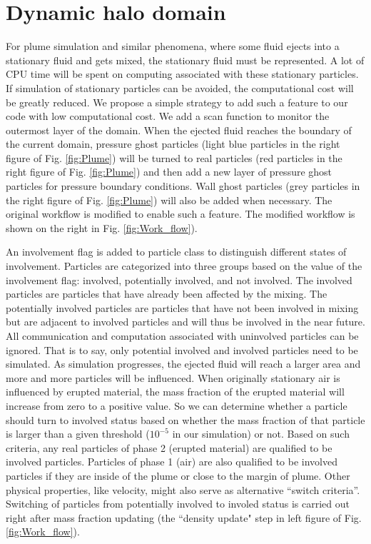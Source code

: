 \section{Dynamic halo domain} 
For plume simulation and similar phenomena, where some fluid ejects into a stationary fluid and gets mixed, the stationary fluid must be represented.
A lot of CPU time will be spent on computing associated with these stationary particles. If simulation of stationary particles can be avoided, the computational cost will be greatly reduced.
We propose a simple strategy to add such a feature to our code with low computational cost. We add a scan function to monitor the outermost layer of the domain. When the ejected fluid reaches the boundary of the current domain, pressure ghost particles (light blue particles in the right figure of Fig. \ref{fig:Plume}) will be turned to real particles (red particles in the right figure of Fig. \ref{fig:Plume}) and then add a new layer of pressure ghost particles for pressure boundary conditions. Wall ghost particles (grey particles in the right figure of Fig. \ref{fig:Plume}) will also be added when necessary. The original workflow is modified to enable such a feature. The modified workflow is shown on the right in Fig. \ref{fig:Work_flow}).

An involvement flag is added to particle class to distinguish different states of involvement. Particles are categorized into three groups based on the value of the involvement flag: involved, potentially involved, and not involved. The involved particles are particles that have already been affected by the mixing. The potentially involved particles are particles that have not been involved in mixing but are adjacent to involved particles and will thus be involved in the near future. 
All communication and computation associated with uninvolved particles can be ignored. That is to say, only potential involved and involved particles need to be simulated.
As simulation progresses, the ejected fluid will reach a larger area and more and more particles will be influenced. When originally stationary air is influenced by erupted material, the mass fraction of the erupted material will increase from zero to a positive value. So we can determine whether a particle should turn to involved status based on whether the mass fraction of that particle is larger than a given threshold ($10^{-5} $ in our simulation) or not. Based on such criteria, any real particles of phase 2 (erupted material) are qualified to be involved particles.  Particles of phase 1 (air) are also qualified to be involved particles if they are inside of the plume or close to the margin of plume. Other physical properties, like velocity, might also serve as alternative ``switch criteria''. Switching of particles from potentially involved to involed status is carried out right after mass fraction updating (the ``density update" step in left figure of Fig. \ref{fig:Work_flow}).


